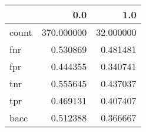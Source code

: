\begin{tabular}{lrr}
\toprule
{} &         0.0 &        1.0 \\
\midrule
count &  370.000000 &  32.000000 \\
fnr   &    0.530869 &   0.481481 \\
fpr   &    0.444355 &   0.340741 \\
tnr   &    0.555645 &   0.437037 \\
tpr   &    0.469131 &   0.407407 \\
bacc  &    0.512388 &   0.366667 \\
\bottomrule
\end{tabular}
